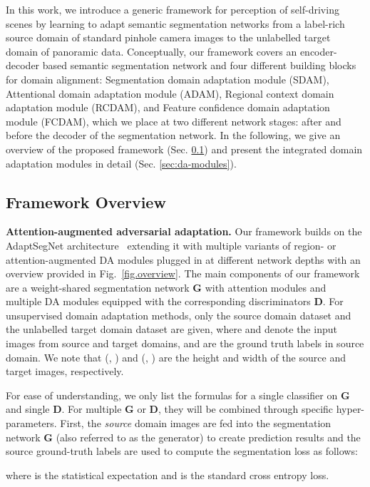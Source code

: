 \documentclass[journal]{IEEEtran}
\begin{document}
In this work, we introduce a generic framework for  perception of self-driving scenes by learning to adapt semantic segmentation networks from a label-rich source domain of standard pinhole camera images to the unlabelled target domain of panoramic data.
Conceptually, our framework covers an encoder-decoder based semantic segmentation network and four different building blocks for domain alignment: Segmentation domain adaptation module (SDAM), Attentional domain adaptation module (ADAM), Regional context domain adaptation module (RCDAM), and Feature confidence domain adaptation module (FCDAM), which we place at two different network stages: after and before the decoder of the segmentation network.
In the following, we  give an overview of the proposed framework (Sec. \ref{sec:overview}) and present the integrated domain adaptation modules in detail (Sec. \ref{sec:da-modules}).

\subsection{Framework Overview}
\label{sec:overview}

\textbf{Attention-augmented adversarial adaptation.}
Our framework builds on the AdaptSegNet architecture~\cite{adaptsegnet} extending it with multiple variants of region- or attention-augmented DA modules plugged in at different network depths with an overview provided in Fig.~\ref{fig.overview}. 
The main components of our framework are a weight-shared segmentation network \textbf{G} with attention modules and multiple DA modules equipped with the corresponding discriminators \textbf{D}.
For unsupervised domain adaptation methods, only the source domain dataset  and the unlabelled target domain dataset  are given, where  and  denote the input images from source and target domains, and  are the ground truth labels in source domain. We note that (, ) and (, ) are the height and width of the source and target images, respectively.

For ease of understanding, we only list the formulas for a single classifier on \textbf{G} and single \textbf{D}. For multiple \textbf{G} or \textbf{D}, they will be combined through specific hyper-parameters. First, the \emph{source} domain images  are fed into the segmentation network \textbf{G} (also referred to as the generator) to create prediction results  and the source ground-truth labels  are used to compute the segmentation loss  as follows:

where  is the statistical expectation and  is the standard cross entropy loss. 
\end{document}

